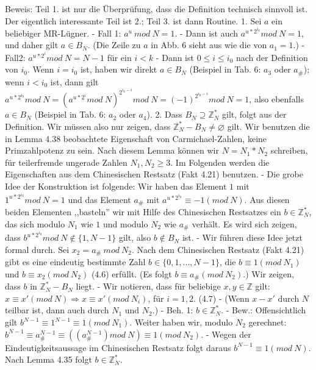 \documentclass[a4paper]{article}
\begin{document}
\begin{multicols}{3}
        Beweis: Teil 1. ist nur die Überprüfung, dass die Definition technisch sinnvoll ist. Der eigentlich interessante Teil ist 2.; Teil 3. ist dann Routine.
        1. Sei $a$ ein beliebiger MR-Lügner.
        - Fall 1: $a^u\ mod\ N = 1$. - Dann ist auch $a^{u*2^{i_0}} mod\ N = 1$, und daher gilt $a\in B_N$. (Die Zeile zu $a$ in Abb. 6 sieht aus wie die von $a_1=1$.)
        - Fall2: $a^{u*2^i} mod\ N=N-1$ für ein $i<k$ - Dann ist $0\leq i\leq i_0$ nach der Definition von $i_0$. Wenn $i=i_0$ ist, haben wir direkt $a\in B_N$ (Beispiel in Tab. 6: $a_3$ oder $a_{\#}$); wenn $i<i_0$ ist, dann gilt $a^{u*2^{i_0}} mod\ N=(a^{u*2^{i}} mod\ N)^{2^{i_{0} -i}} mod\ N= (-1)^{2^{i_{0} -i}} mod\ N= 1$, also ebenfalls $a\in B_N$ (Beispiel in Tab. 6: $a_2$ oder $a_4$).
        2. Dass $B_N\supseteq \mathbb{Z}^*_N$ gilt, folgt aus der Definition. Wir müssen also nur zeigen, dass $\mathbb{Z}^*_N - B_N\not=\varnothing$ gilt. Wir benutzen die in Lemma 4.38 beobachtete Eigenschaft von Carmichael-Zahlen, keine Primzahlpotenz zu sein. Nach diesem Lemma können wir $N=N_1 *N_2$ schreiben, für teilerfremde ungerade Zahlen $N_1,N_2\geq 3$. Im Folgenden werden die Eigenschaften aus dem Chinesischen Restsatz (Fakt 4.21) benutzen.
        - Die grobe Idee der Konstruktion ist folgende: Wir haben das Element $1$ mit $1^{u*2^{i_0}} mod\ N= 1$ und das Element $a_{\#}$ mit $a^{u*2^{i_0}} \equiv -1 (mod\ N)$. Aus diesen beiden Elementen ,,basteln'' wir mit Hilfe des Chinesischen Restsatzes ein $b\in\mathbb{Z}^*_N$, das sich modulo $N_1$ wie $1$ und modulo $N_2$ wie $a_{\#}$ verhält. Es wird sich zeigen, dass $b^{u*2^{i_0}} mod\ N \not\in\{1 ,N-1\}$ gilt, also $b\not\in B_N$ ist.
        - Wir führen diese Idee jetzt formal durch. Sei $x_2=a_{\#}\ mod\ N_2$. Nach dem Chinesischen Restsatz (Fakt 4.21) gibt es eine eindeutig bestimmte Zahl $b\in\{0,1,...,N- 1\}$, die $b\equiv 1(mod\ N_1)$ und $b\equiv x_2(mod\ N_2)$ (4.6) erfüllt. (Es folgt $b\equiv a_{\#}(mod\ N_2)$.) Wir zeigen, dass $b$ in $\mathbb{Z}^*_N-B_N$ liegt.
        - Wir notieren, dass für beliebige $x,y\in\mathbb{Z}$ gilt: $x\equiv x'(mod\ N)\Rightarrow x\equiv x'(mod\ N_i)$, für $i=1,2$. (4.7)
        - (Wenn $x-x'$ durch $N$ teilbar ist, dann auch durch $N_1$ und $N_2$.)
        - Beh. 1: $b\in\mathbb{Z}^*_N$.
        - Bew.: Offensichtlich gilt $b^{N-1} \equiv 1^{N-1} \equiv 1 (mod\ N_1)$. Weiter haben wir, modulo $N_2$ gerechnet: $b^{N-1} \equiv a^{N-1}_{\#}\equiv ((a^{N-1}_{\#}) mod\ N)\equiv 1 (mod\ N_2)$.
        - Wegen der Eindeutigkeitsaussage im Chinesischen Restsatz folgt daraus $b^{N-1} \equiv 1(mod\ N)$. Nach Lemma 4.35 folgt $b\in\mathbb{Z}^*_N$.

\end{multicols}
\end{document}
